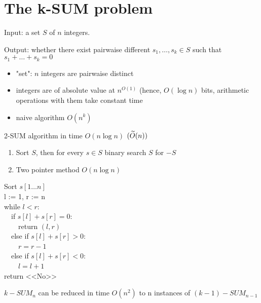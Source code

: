 \section{The k-SUM problem}

\begin{df}
	Input: a set $S$ of $n$ integers.

	Output: whether there exist pairwaise different $s_1, \ldots, s_k \in S$ such that $s_1 + \ldots + s_k = 0$ 

\end{df}

\begin{remrk}

\begin{itemize}
	\item "set": $n$ integers are pairwaise distinct 
	\item integers are of absolute value at $n^{O(1)}$ (hence, $O(\log n)$ bits, arithmetic operations with them take constant time
	\item naive algorithm $O(n^k)$ 
\end{itemize}	
\end{remrk}

\begin{thm}
	2-SUM algorithm in time $O(n \log n)$ $(\widetilde{O} (n))$ 
\end{thm}

\begin{algorithm}
	\begin{enumerate}
		\item Sort $S$, then for every $s \in S$ binary search $S $ for $-S $ 
		\item Two pointer method $O(n \log n)$ 
	\end{enumerate}
\end{algorithm}

	Sort $s[1\ldots n]$ \\	
	l := 1, r := n \\
	while $l < r$: \\
	\ \ if $s[l] + s[r] = 0$: \\ 
	\ \ \ \ return $(l, r)$ \\
	\ \ else if $s[l] + s[r] > 0$: \\
	\ \ \ \ $r = r - 1$ \\
	\ \ else if $s[l] + s[r] < 0$: \\
	\ \ \ \ $l = l + 1$  \\
	return <<No>>

	\begin{lm}
		$k-SUM_n$ can be reduced in time $O(n^2)$ to n instances of $(k - 1)-SUM_{n - 1}$ 
	\end{lm}

